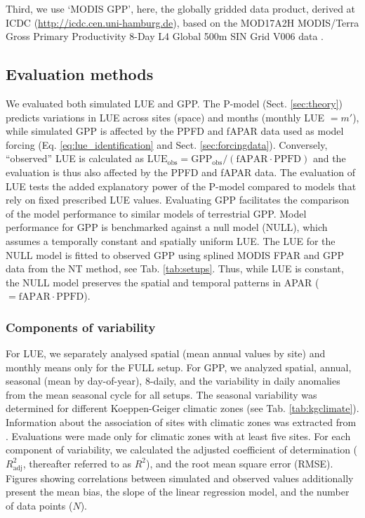 \documentclass[gmd, manuscript]{copernicus}
\begin{document}
Third, we use `MODIS GPP', here, the globally gridded data product, derived at ICDC (\url{http://icdc.cen.uni-hamburg.de}), based on the MOD17A2H MODIS/Terra Gross Primary Productivity 8-Day L4 Global 500m SIN Grid V006 data \citep{modis_MOD17A2H}.

\subsection{Evaluation methods}
\label{sec:methods_eval}

We evaluated both simulated LUE and GPP. The P-model  (Sect. \ref{sec:theory}) predicts variations in LUE across sites (space) and months (monthly LUE $= m'$), while simulated GPP is affected by the PPFD and fAPAR data used as model forcing (Eq. \ref{eq:lue_identification} and Sect. \ref{sec:forcingdata}). Conversely, ``observed'' LUE is calculated as $\text{LUE}_\text{obs} = \text{GPP}_\text{obs} / (\text{fAPAR} \cdot \text{PPFD})$ and the evaluation is thus also affected by the PPFD and fAPAR data. The evaluation of LUE tests the added explanatory power of the P-model compared to models that rely on fixed prescribed LUE values. Evaluating GPP facilitates the comparison of the model performance to similar models of terrestrial GPP. Model performance for GPP is benchmarked against a null model (NULL), which assumes a temporally constant and spatially uniform LUE. The LUE for the NULL model is fitted to observed GPP using splined MODIS FPAR and GPP data from the NT method, see Tab. \ref{tab:setups}. Thus, while LUE is constant, the NULL model preserves the spatial and temporal patterns in APAR ($= \text{fAPAR} \cdot \text{PPFD}$).

\subsubsection{Components of variability}
\label{sec:evalmethod_variability}
For LUE, we separately analysed spatial (mean annual values by site) and monthly means only for the FULL setup. For GPP, we analyzed spatial, annual, seasonal (mean by day-of-year), 8-daily, and the variability in daily anomalies from the mean seasonal cycle for all setups. The seasonal variability was determined for different Koeppen-Geiger climatic zones (see Tab. \ref{tab:kgclimate}). Information about the association of sites with climatic zones was extracted from \citet{falge17}. Evaluations were made only for climatic zones with at least five sites. For each component of variability, we calculated the adjusted coefficient of determination ($R^2_\text{adj}$, thereafter referred to as $R^2$), and the root mean square error (RMSE). Figures showing correlations between simulated and observed values additionally present the mean bias, the slope of the linear regression model, and the number of data points ($N$).
\end{document}
